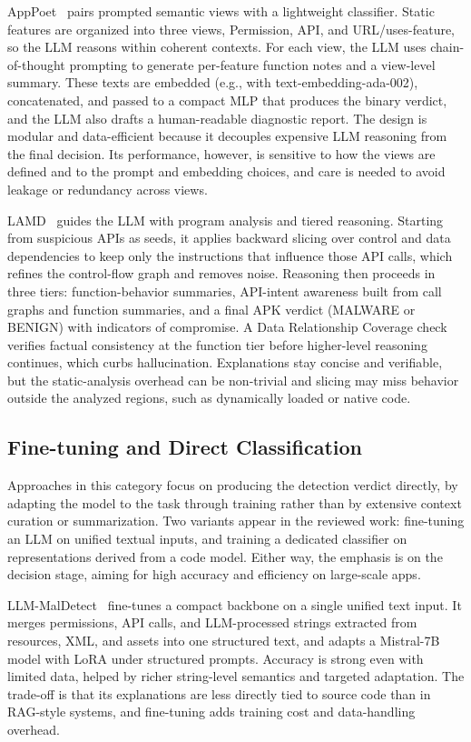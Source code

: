 AppPoet~\cite{Zhao2024-dw} pairs prompted semantic views with a lightweight classifier. Static features are organized into three views, Permission, API, and URL/uses-feature, so the LLM reasons within coherent contexts. For each view, the LLM uses chain-of-thought prompting to generate per-feature function notes and a view-level summary. These texts are embedded (e.g., with text-embedding-ada-002), concatenated, and passed to a compact MLP that produces the binary verdict, and the LLM also drafts a human-readable diagnostic report. The design is modular and data-efficient because it decouples expensive LLM reasoning from the final decision. Its performance, however, is sensitive to how the views are defined and to the prompt and embedding choices, and care is needed to avoid leakage or redundancy across views.

LAMD~\cite{Qian2025-ua} guides the LLM with program analysis and tiered reasoning. Starting from suspicious APIs as seeds, it applies backward slicing over control and data dependencies to keep only the instructions that influence those API calls, which refines the control-flow graph and removes noise. Reasoning then proceeds in three tiers: function-behavior summaries, API-intent awareness built from call graphs and function summaries, and a final APK verdict (MALWARE or BENIGN) with indicators of compromise. A Data Relationship Coverage check verifies factual consistency at the function tier before higher-level reasoning continues, which curbs hallucination. Explanations stay concise and verifiable, but the static-analysis overhead can be non-trivial and slicing may miss behavior outside the analyzed regions, such as dynamically loaded or native code.

\subsection{Fine-tuning and Direct Classification}

Approaches in this category focus on producing the detection verdict directly, by adapting the model to the task through training rather than by extensive context curation or summarization. Two variants appear in the reviewed work: fine-tuning an LLM on unified textual inputs, and training a dedicated classifier on representations derived from a code model. Either way, the emphasis is on the decision stage, aiming for high accuracy and efficiency on large-scale apps.

LLM-MalDetect~\cite{Feng2025-ry} fine-tunes a compact backbone on a single unified text input. It merges permissions, API calls, and LLM-processed strings extracted from resources, XML, and assets into one structured text, and adapts a Mistral-7B model with LoRA under structured prompts. Accuracy is strong even with limited data, helped by richer string-level semantics and targeted adaptation. The trade-off is that its explanations are less directly tied to source code than in RAG-style systems, and fine-tuning adds training cost and data-handling overhead.

